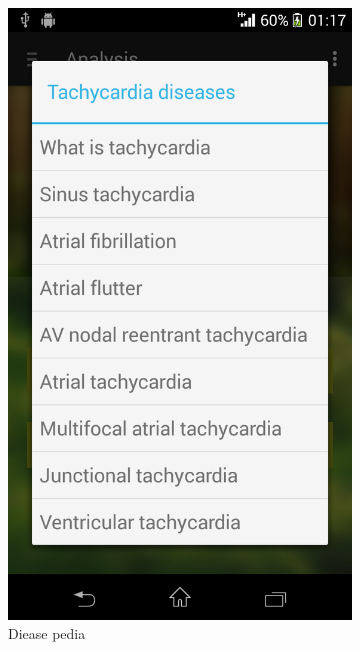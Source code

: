 \begin{figure}
\begin{subfigure}{.24\textwidth}
  \includegraphics[width=.8\linewidth]{img/screenshot/ss12.png}
  \caption{Diease pedia}
\end{subfigure}
\begin{subfigure}{.24\textwidth}
  \centering

\end{subfigure}
\end{figure}
